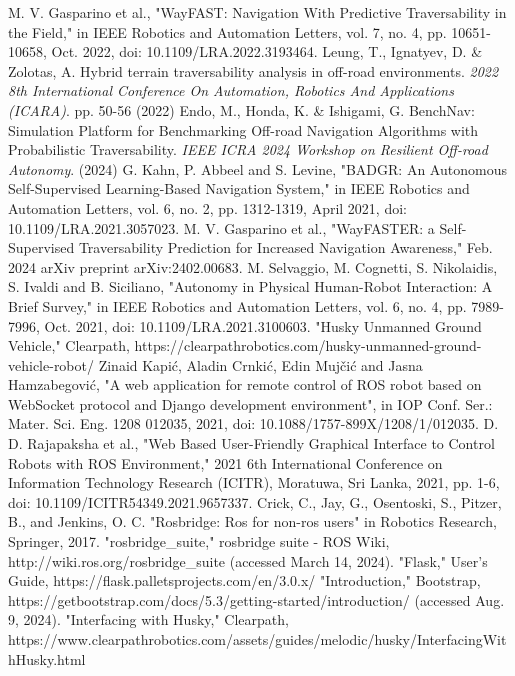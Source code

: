 \documentclass[letterpaper, 10 pt, conference]{ieeeconf}  %
\begin{document}




\begin{thebibliography}{99}

 M. V. Gasparino et al., "WayFAST: Navigation With Predictive Traversability in the Field," in IEEE Robotics and Automation Letters, vol. 7, no. 4, pp. 10651-10658, Oct. 2022, doi: 10.1109/LRA.2022.3193464.
Leung, T., Ignatyev, D. \& Zolotas, A. Hybrid terrain traversability analysis in off-road environments. {\em 2022 8th International Conference On Automation, Robotics And Applications (ICARA)}. pp. 50-56 (2022)
Endo, M., Honda, K. \& Ishigami, G. BenchNav: Simulation Platform for Benchmarking Off-road Navigation Algorithms with Probabilistic Traversability. {\em IEEE ICRA 2024 Workshop on Resilient Off-road Autonomy}. (2024)
 G. Kahn, P. Abbeel and S. Levine, "BADGR: An Autonomous Self-Supervised Learning-Based Navigation System," in IEEE Robotics and Automation Letters, vol. 6, no. 2, pp. 1312-1319, April 2021, doi: 10.1109/LRA.2021.3057023.
 M. V. Gasparino et al., "WayFASTER: a Self-Supervised Traversability Prediction for Increased Navigation Awareness," Feb. 2024 arXiv preprint arXiv:2402.00683.
 M. Selvaggio, M. Cognetti, S. Nikolaidis, S. Ivaldi and B. Siciliano, "Autonomy in Physical Human-Robot Interaction: A Brief Survey," in IEEE Robotics and Automation Letters, vol. 6, no. 4, pp. 7989-7996, Oct. 2021, doi: 10.1109/LRA.2021.3100603.
"Husky Unmanned Ground Vehicle," Clearpath, https://clearpathrobotics.com/husky-unmanned-ground-vehicle-robot/
 Zinaid Kapić, Aladin Crnkić, Edin Mujčić and Jasna Hamzabegović, "A web application for remote control of ROS robot based on WebSocket protocol and Django development environment", in IOP Conf. Ser.: Mater. Sci. Eng. 1208 012035, 2021, doi: 10.1088/1757-899X/1208/1/012035.
 D. D. Rajapaksha et al., "Web Based User-Friendly Graphical Interface to Control Robots with ROS Environment," 2021 6th International Conference on Information Technology Research (ICITR), Moratuwa, Sri Lanka, 2021, pp. 1-6, doi: 10.1109/ICITR54349.2021.9657337.
 Crick, C., Jay, G., Osentoski, S., Pitzer, B., and Jenkins, O. C. "Rosbridge: Ros for non-ros users" in Robotics Research, Springer, 2017.
"rosbridge\_suite," rosbridge suite - ROS Wiki, http://wiki.ros.org/rosbridge\_suite (accessed March 14, 2024).
"Flask," User’s Guide, https://flask.palletsprojects.com/en/3.0.x/
"Introduction," Bootstrap, https://getbootstrap.com/docs/5.3/getting-started/introduction/ (accessed Aug. 9, 2024).
"Interfacing with Husky," Clearpath, https://www.clearpathrobotics.com/assets/guides/melodic/husky/InterfacingWithHusky.html






\end{thebibliography}
\end{document}
